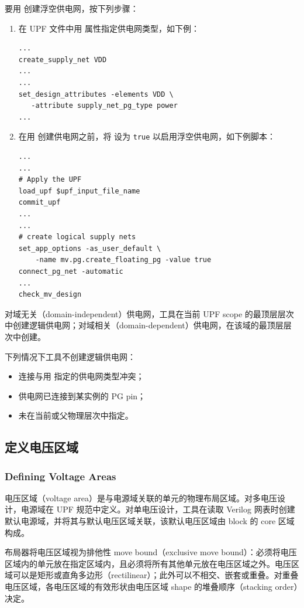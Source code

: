 要用  创建浮空供电网，按下列步骤：
\begin{enumerate}
  \item 在 UPF 文件中用  属性指定供电网类型，如下例：
\begin{lstlisting}
...
create_supply_net VDD
...
...
set_design_attributes -elements VDD \
   -attribute supply_net_pg_type power
...
\end{lstlisting}

  \item 在用  创建供电网之前，将  设为 \texttt{true} 以启用浮空供电网，如下例脚本：
\begin{lstlisting}
...
...
# Apply the UPF
load_upf $upf_input_file_name
commit_upf
...
...
# create logical supply nets
set_app_options -as_user_default \
    -name mv.pg.create_floating_pg -value true
connect_pg_net -automatic
...
check_mv_design
\end{lstlisting}
\end{enumerate}

对域无关（domain-independent）供电网，工具在当前 UPF scope 的最顶层层次中创建逻辑供电网；对域相关（domain-dependent）供电网，在该域的最顶层层次中创建。

下列情况下工具不创建逻辑供电网：
\begin{itemize}
  \item 连接与用  指定的供电网类型冲突；
  \item 供电网已连接到某实例的 PG pin；
  \item \cmd{connect\_pg\_net} 未在当前或父物理层次中指定。
\end{itemize}

\subsection{定义电压区域}
\subsubsection*{Defining Voltage Areas}

电压区域（voltage area）是与电源域关联的单元的物理布局区域。对多电压设计，电源域在 UPF 规范中定义。对单电压设计，工具在读取 Verilog 网表时创建默认电源域，并将其与默认电压区域关联，该默认电压区域由 block 的 core 区域构成。

布局器将电压区域视为排他性 move bound（exclusive move bound）：必须将电压区域内的单元放在指定区域内，且必须将所有其他单元放在电压区域之外。电压区域可以是矩形或直角多边形（rectilinear）；此外可以不相交、嵌套或重叠。对重叠电压区域，各电压区域的有效形状由电压区域 shape 的堆叠顺序（stacking order）决定。

